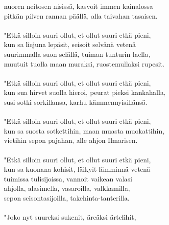 nuoren neitosen nisissä, kasvoit immen kainalossa                      \\
pitkän pilven rannan päällä, alla taivahan tasaisen.                   \\
                                                                       \\
"Etkä silloin suuri ollut, et ollut suuri etkä pieni,                  \\
kun sa liejuna lepäsit, seisoit selvänä vetenä                         \\
suurimmalla suon selällä, tuiman tunturin laella,                      \\
muutuit tuolla maan muraksi, ruostemullaksi rupesit.                   \\
                                                                       \\
"Etkä silloin suuri ollut, et ollut suuri etkä pieni,                  \\
kun sua hirvet suolla hieroi, peurat pieksi kankahalla,                \\
susi sotki sorkillansa, karhu kämmennyisillänsä.                       \\
                                                                       \\
"Etkä silloin suuri ollut, et ollut suuri etkä pieni,                  \\
kun sa suosta sotkettihin, maan muasta muokattihin,                    \\
vietihin sepon pajahan, alle ahjon Ilmarisen.                          \\
                                                                       \\
"Etkä silloin suuri ollut, et ollut suuri etkä pieni,                  \\
kun sa kuonana kohisit, läikyit lämminnä vetenä                        \\
tuimissa tulisijoissa, vannoit vaikean valasi                          \\
ahjolla, alasimella, vasaroilla, valkkamilla,                          \\
sepon seisontasijoilla, takehinta-tanterilla.                          \\
                                                                       \\
"Joko nyt suureksi sukenit, äreäksi ärtelihit,                         \\
